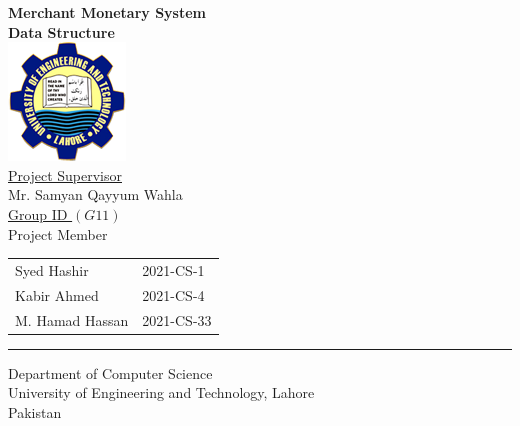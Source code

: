 \documentclass[12pt,a4paper]{report}
\begin{document}
\thispagestyle{empty}
\begin{center}
\textbf{\large{Merchant Monetary System}}\\
\vspace{0.5cm}
\textbf{ Data Structure} \\
\vspace{1.5cm}
\includegraphics[scale=.07]{UETLogo}\\
\vspace{1.5cm}
\underline{ Project Supervisor}\\
\vspace{0.5cm}
Mr. Samyan Qayyum Wahla\\
\vspace{1cm}
\underline {Group ID $(G 11)$} \\
\vspace{0.5cm}
Project Member\\
\vspace{0.5cm}
\begin{tabular}{ m{5cm} m{4cm}}
 Syed Hashir & 2021-CS-1 \\ 
 Kabir Ahmed & 2021-CS-4  \\  
 M. Hamad Hassan & 2021-CS-33
\end{tabular}
\vspace{2cm}
\par\rule{\textwidth}{0.5pt} 
Department of Computer Science\\
University of Engineering and Technology, Lahore\\
Pakistan
\end{center}
\newpage
\end{document}
